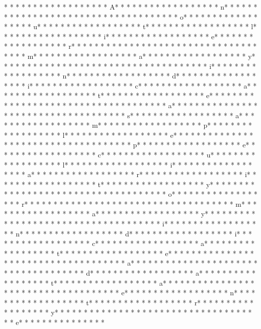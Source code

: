* * *  * * *  * * *  *  * * *  *  * * *  * A* * *  * * *  * * *  *  * * *  *  * * *  * n* * *  * * *  * * *  *  * * *  *  * * *  *  * * *  * * *  * * *  *  * * *  *  * * *  * o* * *  * * *  * * *  *  * * *  *  * * *  * u* * *  * * *  * * *  *  * * *  *  * * *  * t* * *  * * *  * * *  *  * * *  *  * * *  * l* * *  * * *  * * *  *  * * *  *  * * *  * i* * *  * * *  * * *  *  * * *  *  * * *  * e* * *  * * *  * * *  *  * * *  *  * * *  * r* * *  * * *  * * *  *  * * *  *  * * *  *  * * *  * * *  * * *  *  * * *  *  * * *  * m* * *  * * *  * * *  *  * * *  *  * * *  * a* * *  * * *  * * *  *  * * *  *  * * *  * y* * *  * * *  * * *  *  * * *  *  * * *  *  * * *  * * *  * * *  *  * * *  *  * * *  * i* * *  * * *  * * *  *  * * *  *  * * *  * n* * *  * * *  * * *  *  * * *  *  * * *  * d* * *  * * *  * * *  *  * * *  *  * * *  * i* * *  * * *  * * *  *  * * *  *  * * *  * c* * *  * * *  * * *  *  * * *  *  * * *  * a* * *  * * *  * * *  *  * * *  *  * * *  * t* * *  * * *  * * *  *  * * *  *  * * *  * e* * *  * * *  * * *  *  * * *  *  * * *  *  * * *  * * *  * * *  *  * * *  *  * * *  * a* * *  * * *  * * *  *  * * *  *  * * *  *  * * *  * * *  * * *  *  * * *  *  * * *  * s* * *  * * *  * * *  *  * * *  *  * * *  * a* * *  * * *  * * *  *  * * *  *  * * *  * m* * *  * * *  * * *  *  * * *  *  * * *  * p* * *  * * *  * * *  *  * * *  *  * * *  * l* * *  * * *  * * *  *  * * *  *  * * *  * e* * *  * * *  * * *  *  * * *  *  * * *  *  * * *  * * *  * * *  *  * * *  *  * * *  * p* * *  * * *  * * *  *  * * *  *  * * *  * e* * *  * * *  * * *  *  * * *  *  * * *  * c* * *  * * *  * * *  *  * * *  *  * * *  * u* * *  * * *  * * *  *  * * *  *  * * *  * l* * *  * * *  * * *  *  * * *  *  * * *  * i* * *  * * *  * * *  *  * * *  *  * * *  * a* * *  * * *  * * *  *  * * *  *  * * *  * r* * *  * * *  * * *  *  * * *  *  * * *  * i* * *  * * *  * * *  *  * * *  *  * * *  * t* * *  * * *  * * *  *  * * *  *  * * *  * y* * *  * * *  * * *  *  * * *  *  * * *  *  * * *  * * *  * * *  *  * * *  *  * * *  * o* * *  * * *  * * *  *  * * *  *  * * *  * r* * *  * * *  * * *  *  * * *  *  * * *  *  * * *  * * *  * * *  *  * * *  *  * * *  * m* * *  * * *  * * *  *  * * *  *  * * *  * a* * *  * * *  * * *  *  * * *  *  * * *  * y* * *  * * *  * * *  *  * * *  *  * * *  *  * * *  * * *  * * *  *  * * *  *  * * *  * i* * *  * * *  * * *  *  * * *  *  * * *  * n* * *  * * *  * * *  *  * * *  *  * * *  * d* * *  * * *  * * *  *  * * *  *  * * *  * i* * *  * * *  * * *  *  * * *  *  * * *  * c* * *  * * *  * * *  *  * * *  *  * * *  * a* * *  * * *  * * *  *  * * *  *  * * *  * t* * *  * * *  * * *  *  * * *  *  * * *  * e* * *  * * *  * * *  *  * * *  *  * * *  *  * * *  * * *  * * *  *  * * *  *  * * *  * a* * *  * * *  * * *  *  * * *  *  * * *  *  * * *  * * *  * * *  *  * * *  *  * * *  * d* * *  * * *  * * *  *  * * *  *  * * *  * a* * *  * * *  * * *  *  * * *  *  * * *  * t* * *  * * *  * * *  *  * * *  *  * * *  * a* * *  * * *  * * *  *  * * *  *  * * *  *  * * *  * * *  * * *  *  * * *  *  * * *  * e* * *  * * *  * * *  *  * * *  *  * * *  * n* * *  * * *  * * *  *  * * *  *  * * *  * t* * *  * * *  * * *  *  * * *  *  * * *  * r* * *  * * *  * * *  *  * * *  *  * * *  * y* * *  * * *  * * *  *  * * *  *  * * *  *  * * *  * * *  * * *  *  * * *  *  * * *  * e* * *  * * *  * * *  *  * * *  *  * 
